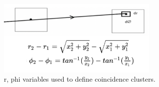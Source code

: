 \begin{figure}[!htp]
\centering
\includegraphics[width=0.7\textwidth]{ashish_thesis/dr_dphi_variables1_1.png}
\caption[New Variables For Two Fold Coincidences]{%
  r, phi variables used to define coincidence clusters. %
}
\label{fig:drdphi_diagram}
\end{figure}

